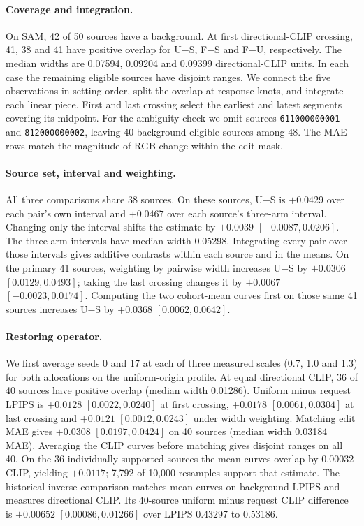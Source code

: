 \paragraph{Coverage and integration.}
On SAM, 42 of 50 sources have a background. At first directional-CLIP crossing, 41, 38 and 41 have positive overlap for U$-$S, F$-$S and F$-$U, respectively. The median widths are 0.07594, 0.09204 and 0.09399 directional-CLIP units. In each case the remaining eligible sources have disjoint ranges. We connect the five observations in setting order, split the overlap at response knots, and integrate each linear piece. First and last crossing select the earliest and latest segments covering its midpoint. For the ambiguity check we omit sources \texttt{611000000001} and \texttt{812000000002}, leaving 40 background-eligible sources among 48. The MAE rows match the magnitude of RGB change within the edit mask.

\paragraph{Source set, interval and weighting.}
All three comparisons share 38 sources. On these sources, U$-$S is $+0.0429$ over each pair's own interval and $+0.0467$ over each source's three-arm interval. Changing only the interval shifts the estimate by $+0.0039$ $[-0.0087,0.0206]$. The three-arm intervals have median width 0.05298. Integrating every pair over those intervals gives additive contrasts within each source and in the means. On the primary 41 sources, weighting by pairwise width increases U$-$S by $+0.0306$ $[0.0129,0.0493]$; taking the last crossing changes it by $+0.0067$ $[-0.0023,0.0174]$. Computing the two cohort-mean curves first on those same 41 sources increases U$-$S by $+0.0368$ $[0.0062,0.0642]$.

\paragraph{Restoring operator.}
We first average seeds 0 and 17 at each of three measured scales (0.7, 1.0 and 1.3) for both allocations on the uniform-origin profile. At equal directional CLIP, 36 of 40 sources have positive overlap (median width 0.01286). Uniform minus request LPIPS is $+0.0128$ $[0.0022,0.0240]$ at first crossing, $+0.0178$ $[0.0061,0.0304]$ at last crossing and $+0.0121$ $[0.0012,0.0243]$ under width weighting. Matching edit MAE gives $+0.0308$ $[0.0197,0.0424]$ on 40 sources (median width 0.03184 MAE). Averaging the CLIP curves before matching gives disjoint ranges on all 40. On the 36 individually supported sources the mean curves overlap by 0.00032 CLIP, yielding $+0.0117$; 7,792 of 10,000 resamples support that estimate. The historical inverse comparison matches mean curves on background LPIPS and measures directional CLIP. Its 40-source uniform minus request CLIP difference is $+0.00652$ $[0.00086,0.01266]$ over LPIPS 0.43297 to 0.53186.

